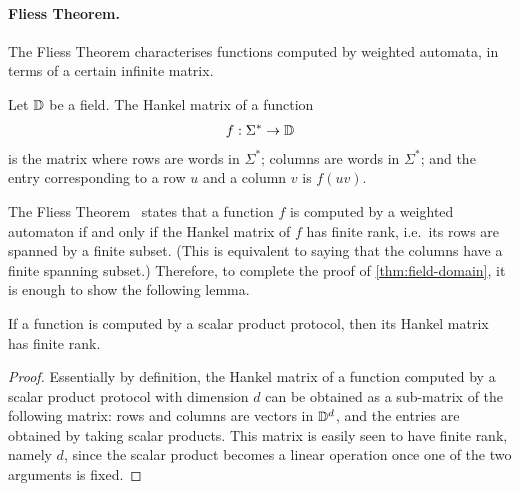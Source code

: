 \paragraph*{Fliess Theorem.} The Fliess Theorem characterises functions computed by weighted automata, in terms of a certain infinite matrix.

\begin{definition}\label{def:hankel-matrix}
    Let $\mathbb D$ be a field. The Hankel matrix of a function 
    \begin{align*}
    f : \Sigma^* \to \mathbb D
    \end{align*}  
    is the matrix where rows are words in $\Sigma^*$; columns are words in $\Sigma^*$; and the entry corresponding to a row $u$ and a column $v$ is $f(uv)$.
\end{definition}

The Fliess Theorem~\cite[Theorem 2.1.1]{fliess1974} states that a function $f$ is computed by a weighted automaton if and only if the Hankel matrix of $f$ has finite rank, i.e.~its rows are spanned by a finite subset. (This is equivalent to saying that the columns have a finite spanning subset.) Therefore, to complete the proof of \cref{thm:field-domain}, it is enough to show the following lemma.

\begin{lemma}\label{lem:hankel-finite-rank}
    If a function is computed by a scalar product protocol, then its Hankel matrix has finite rank.
\end{lemma}
\begin{proof}
    Essentially by definition, the Hankel matrix of a function computed by a scalar product protocol with dimension $d$ can be obtained as a sub-matrix of the following matrix: rows and columns are vectors in $\mathbb D^d$, and the entries are obtained by taking scalar products. This matrix is easily seen to have finite rank, namely $d$, since the scalar product  becomes a linear operation once one of the two arguments is fixed.
\end{proof}
